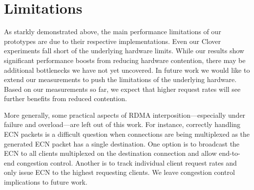 \section{Limitations}

As starkly demonstrated above, the main performance limitations of
our {\sword} prototypes are due to their respective implementations.
%
Even our Clover experiments fall short of the underlying hardware
limits.  While our results show significant performance boosts from
reducing hardware contention, there may be additional bottlenecks we
have not yet uncovered. In future work we would like to extend our
measurements to push the limitations of the underlying hardware.
Based on our measurements so far, we expect that higher request rates
will see further benefits from reduced contention.


More generally, some practical aspects of RDMA
interposition---especially under failure and overload---are left out
of this work. For instance, correctly handling ECN packets is a
difficult question when connections are being multiplexed as the
generated ECN packet has a single destination. One option is to
broadcast the ECN to all clients multiplexed on the destination
connection and allow end-to-end congestion control. Another is to track individual client request rates and only issue ECN to the
highest requesting clients. We leave congestion
control implications to future work.
